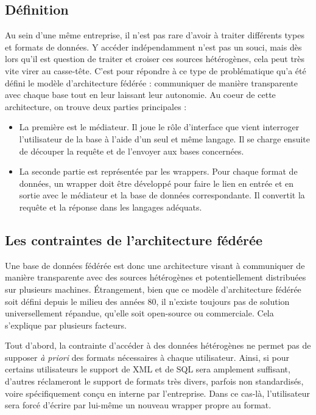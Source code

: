 \documentclass[a4paper,10pt]{article}
\begin{document}
\subsection{Définition}
Au sein d'une même entreprise, il n'est pas rare d'avoir à traiter différents types et formats de données. Y accéder indépendamment n'est pas un souci, mais dès lors qu'il est question de traiter et croiser ces sources hétérogènes, cela peut très vite virer au casse-tête. C'est pour répondre à ce type de problématique qu'a été défini le modèle d'architecture fédérée : communiquer de manière transparente avec chaque base tout en leur laissant leur autonomie. Au coeur de cette architecture, on trouve deux parties principales : 
\begin{itemize}
\item La première est le médiateur. Il joue le rôle d'interface que vient interroger l'utilisateur de la base à l'aide d'un seul et même langage. Il se charge ensuite de découper la requête et de l'envoyer aux bases concernées.
\item La seconde partie est représentée par les wrappers. Pour chaque format de données, un wrapper doit être développé pour faire le lien en entrée et en sortie avec le médiateur et la base de données correspondante. Il convertit la requête et la réponse dans les langages adéquats.
\end{itemize}

\subsection{Les contraintes de l'architecture fédérée}
Une base de données fédérée est donc une architecture visant à communiquer de manière transparente avec des sources hétérogènes et potentiellement distribuées sur plusieurs machines. Étrangement, bien que ce modèle d'architecture fédérée soit défini depuis le milieu des années 80, il n'existe toujours pas de solution universellement répandue, qu'elle soit open-source ou commerciale. Cela s'explique par plusieurs facteurs. 

Tout d'abord, la contrainte d'accéder à des données hétérogènes ne permet pas de supposer \textit{à priori} des formats nécessaires à chaque utilisateur. Ainsi, si pour certains utilisateurs le support de XML et de SQL sera amplement suffisant, d'autres réclameront le support de formats très divers, parfois non standardisés, voire spécifiquement conçu en interne par l'entreprise. Dans ce cas-là, l'utilisateur sera forcé d'écrire par lui-même un nouveau wrapper propre au format.
\end{document}
